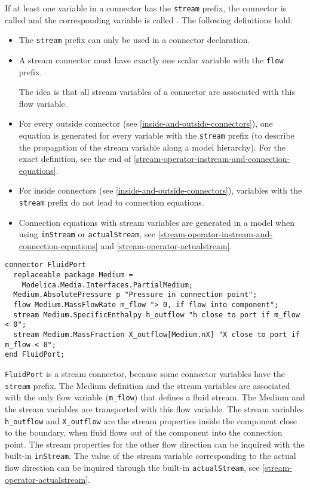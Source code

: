 If at least one variable in a connector has the \lstinline!stream! prefix,
the connector is called  and the corresponding
variable is called . The following definitions hold:
\begin{itemize}
\item
  The \lstinline!stream! prefix can only be used in a connector
  declaration.
\item
  A stream connector must have exactly one scalar variable with the \lstinline!flow! prefix.
  \begin{nonnormative}
  The idea is that all stream variables of a connector are associated with this flow variable.
  \end{nonnormative}
\item
  For every outside connector (see \cref{inside-and-outside-connectors}), one
  equation is generated for every variable with the \lstinline!stream!
  prefix (to describe the propagation of the stream variable
  along a model hierarchy). For the exact definition, see the end of
  \cref{stream-operator-instream-and-connection-equations}.
\item
  For inside connectors (see \cref{inside-and-outside-connectors}), variables
  with the \lstinline!stream! prefix do not lead to connection equations.
\item
  Connection equations with stream variables are generated in a model when using \lstinline!inStream! or \lstinline!actualStream!,
  see \cref{stream-operator-instream-and-connection-equations} and \cref{stream-operator-actualstream}.
\end{itemize}

\begin{example}
\begin{lstlisting}[language=modelica]
connector FluidPort
  replaceable package Medium =
    Modelica.Media.Interfaces.PartialMedium;
  Medium.AbsolutePressure p "Pressure in connection point";
  flow Medium.MassFlowRate m_flow "> 0, if flow into component";
  stream Medium.SpecificEnthalpy h_outflow "h close to port if m_flow < 0";
  stream Medium.MassFraction X_outflow[Medium.nX] "X close to port if m_flow < 0";
end FluidPort;
\end{lstlisting}
\lstinline!FluidPort! is a stream connector, because some connector variables
have the \lstinline!stream! prefix. The Medium definition and the stream
variables are associated with the only flow variable (\lstinline!m_flow!) that
defines a fluid stream. The Medium and the stream variables are
transported with this flow variable. The stream variables \lstinline!h_outflow! and
\lstinline!X_outflow! are the stream properties inside the component close to the
boundary, when fluid flows out of the component into the connection
point. The stream properties for the other flow direction can be
inquired with the built-in \lstinline!inStream!. The value of
the stream variable corresponding to the actual flow direction can be
inquired through the built-in \lstinline!actualStream!, see
\cref{stream-operator-actualstream}.
\end{example}

